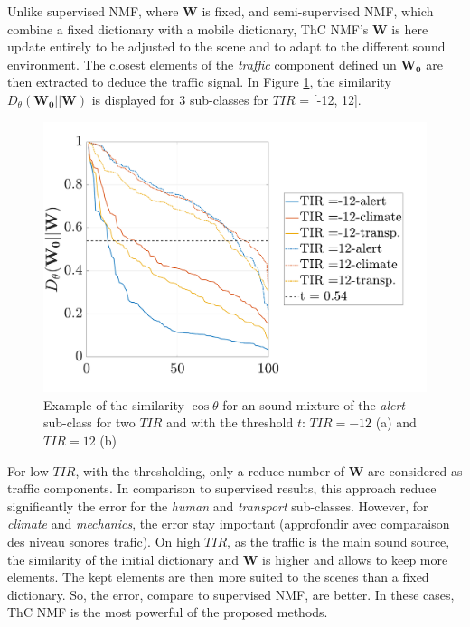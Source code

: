 \documentclass[twocolumn,a4paper,10pt]{article}
\begin{document}
Unlike supervised NMF, where $\mathbf{W}$ is fixed, and semi-supervised NMF, which combine a fixed dictionary with a mobile dictionary, ThC NMF's $\mathbf{W}$ is here update entirely to be adjusted to the scene and to adapt to the different sound environment. The closest elements of the \textit{traffic} component defined un $\mathbf{W_0}$ are then extracted to deduce the traffic signal. In Figure \ref{fig:dist_-12_12}, the similarity $D_{\theta}(\mathbf{W_0}||\mathbf{W})$ is displayed for 3 sub-classes for $TIR$ = [-12, 12].

\begin{figure}[t]
    \centering
    \includegraphics[width=\linewidth]{figures/dist_-12_12.pdf}
    \caption{Example of the similarity $\cos \theta$ for an sound mixture of the \textit{alert} sub-class for two $TIR$ and with the threshold $t$: $TIR = -12$ (a) and $TIR = 12$ (b)}
    \label{fig:dist_-12_12}
\end{figure}

For low $TIR$, with the thresholding, only a reduce number of $\mathbf{W}$ are considered as traffic components. In comparison to supervised results, this approach reduce significantly the error for the \textit{human} and \textit{transport} sub-classes.  However, for \textit{climate} and \textit{mechanics}, the error stay important (approfondir avec comparaison des niveau sonores trafic). On high $TIR$, as the traffic is the main sound source, the similarity of the initial dictionary and $\mathbf{W}$ is higher and allows to keep more elements. The kept elements are then more suited to the scenes than a fixed dictionary. So, the error, compare to supervised NMF, are better. In these cases, ThC NMF is the most powerful of the proposed methods.
\end{document}
